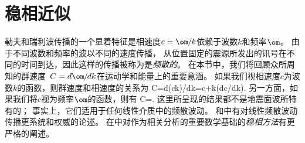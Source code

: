 \section{稳相近似}
%
\label{11.sec.group}

勒夫和瑞利波传播的一个显着特征是相速度$c=\om\hspace{-0.2 mm}/\hspace{-0.2 mm}k$依赖于波数$k$和频率$\om$。
由于不同波数和频率的波以不同的速度传播，
从位置固定的震源所发出的讯号在不同的时间到达，因此这样的传播被称为是{\em 频散的\/}。
%
%
在本节中，我们将回顾众所周知的群速度~$C=d\om\hspace{-0.3 mm}/\hspace{-0.3 mm}dk$在运动学和能量上的重要意涵。
如果我们视相速度$c$为波数$k$的函数，则群速度和相速度的关系为
%
%
%
%
\eq
C=d(ck)\hspace{-0.2 mm}/\hspace{-0.3 mm}dk=c+k(dc/\hspace{-0.3 mm}dk).
\en
另一方面，如果我们将$c$视为频率$\om$的函数，则有
\eq \label{11.Ccreln}
C=.
\en
这里所呈现的结果都不是地震面波所特有的；
事实上，它们适用于任何线性介质中的频散波动。
\textcite{whitham74}和\textcite{lighthill78}中有对线性频散波动传播更系统和权威的论述。
在\textcite{bender&orszag78}中对作为相关分析的重要数学基础的{\em 稳相方法\/}有更严格的阐述。
%

